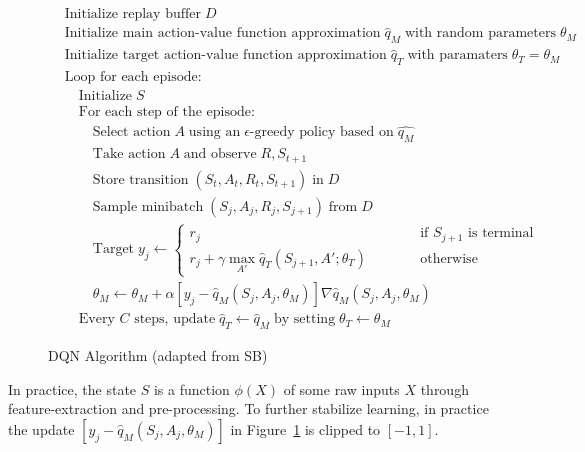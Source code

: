 \begin{figure}
\small
\begin{tcolorbox}[colback=code]
\vspace{-\baselineskip}
\begin{align*}
& \text{Initialize replay buffer}\;D \\
& \text{Initialize main action-value function approximation}\;\hat{q}_M\;\text{with random parameters}\;\theta_M \\
& \text{Initialize target action-value function approximation}\;\hat{q}_T\;\text{with paramaters}\;\theta_T=\theta_M \\
& \text{Loop for each episode:}\\
& \quad \text{Initialize}\;S \\
& \quad \text{For each step of the episode:} \\
& \quad \quad \text{Select action}\; A \; \text{using an} \; \text{$\epsilon$-greedy policy based on}\; \hat{q_M}\\
& \quad \quad \text{Take action} \; A \; \text{and observe}\;R, S_{t+1} \\
& \quad \quad \text{Store transition} \; (S_t , A_t , R_t , S_{t+1} ) \; \text{in} \; D \\
& \quad \quad \text{Sample minibatch} \; (S_j , A_j , R_j , S_{j+1} ) \; \text{from} \; D \\
& \quad \quad \text{Target}\;y_j \leftarrow \begin{cases} r_j & \qquad \quad \text{if $S_{j+1}$ is terminal} \\
r_j + \gamma \operatorname*{max}_{A'} \hat{q}_T(S_{j+1}, A'; \theta_T) & \qquad \quad \text{otherwise}\end{cases} \\
& \quad \quad \theta_M \leftarrow \theta_M + \alpha [y_j - \hat{q}_M (S_j, A_j, \theta_M)] \nabla \hat{q}_M(S_j, A_j, \theta_M) \hspace{1in} \\
& \quad \text{Every $C$ steps, update}\; \hat{q}_T \leftarrow \hat{q}_M\;\text{by setting}\; \theta_T \leftarrow \theta_M
\end{align*}
\end{tcolorbox}
\caption{DQN Algorithm (adapted from SB)}
\label{fig:dqn}
\end{figure}

In practice, the state $S$ is a function $\phi(X)$ of some raw inputs $X$ through feature-extraction and pre-processing. To further stabilize learning, in practice the update $[y_j - \hat{q}_M (S_j, A_j, \theta_M)]$ in Figure~\ref{fig:dqn} is clipped to $[-1, 1]$.

